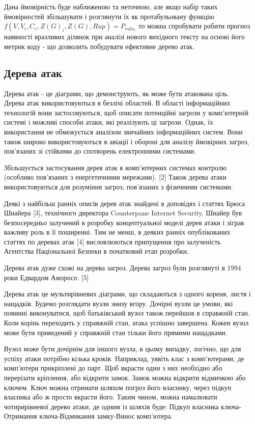 Дана ймовірність буде наближеною та неточною, але якщо набір таких ймовірностей збільшувати і розглянути їх як протабульовану функцію
$f(V,V_i,C_v,Z(G)_i,Z(G),Rup) = P_{vuln_i}$
то можна спробувати робити прогноз наявності вразливих ділянок при аналізі нового вихідного тексту на основі  його метрик коду - що дозволить побудувати ефективне дерево атак.


\subsection{Дерева атак}
\label{2section:id14}
Дерева атак - це діаграми, що демонструють, як може бути атакована ціль. Дерева атак використовуються в безлічі областей. В області інформаційних технологій вони застосовуються, щоб описати потенційні загрози  у комп'ютерній системі і можливі способи атаки, які реалізують ці загрози. Однак, їх використання не обмежується аналізом звичайних інформаційних систем. Вони також широко використовуються в авіації і обороні для аналізу ймовірних загроз, пов'язаних зі стійкими до спотворень електронними системами.

Збільшується застосування дерев атак в комп'ютерних системах контролю (особливо пов'язаних з енергетичними мережами). {[}2{]} Також дерева атаки використовуються для розуміння загроз, пов'язаних з фізичними системами.

Деякі з найбільш ранніх описів дерев атак знайдені в доповідях і статтях Брюса Шнайера {[}3{]}, технічного директора Counterpane Internet Security. Шнайер був безпосередньо залучений в розробку концептуальної моделі дерев атаки і зіграв важливу роль в її поширенні. Тим не менш, в деяких ранніх опублікованих статтях по деревах атак {[}4{]} висловлюються припущення про залученість Агентства Національної Безпеки в початковий етап розробки.

Дерева атак дуже схожі на дерева загроз. Дерева загроз були розглянуті в 1994 роки Едвардом Аморосо. {[}5{]}

Дерева атак це мультирівневих діаграми, що складаються з одного кореня, листя і нащадків. Будемо розглядати вузли знизу вгору. Дочірні вузли це умови, які повинні виконуватися, щоб батьківський вузол також перейшов в справжній стан. Коли корінь переходить у справжній стан, атака успішно завершена. Кожен вузол може бути приведений у справжній стан тільки його прямими нащадками.

Вузол може бути дочірнім для іншого вузла, в цьому випадку, логічно, що для успіху атаки потрібно кілька кроків. Наприклад, уявіть клас з комп'ютерами, де комп'ютери прикріплені до парт. Щоб вкрасти один з них необхідно або перерізати кріплення, або відкрити замок. Замок можна відкрити відмичкою або ключем. Ключ можна отримати шляхом погроз його власнику, через підкуп власника або ж просто вкрасти його. Таким чином, можна намалювати чотирирівневої дерево атаки, де одним із шляхів буде: Підкуп власника ключа-Отримання ключа-Відмикання замку-Винос комп'ютера.

